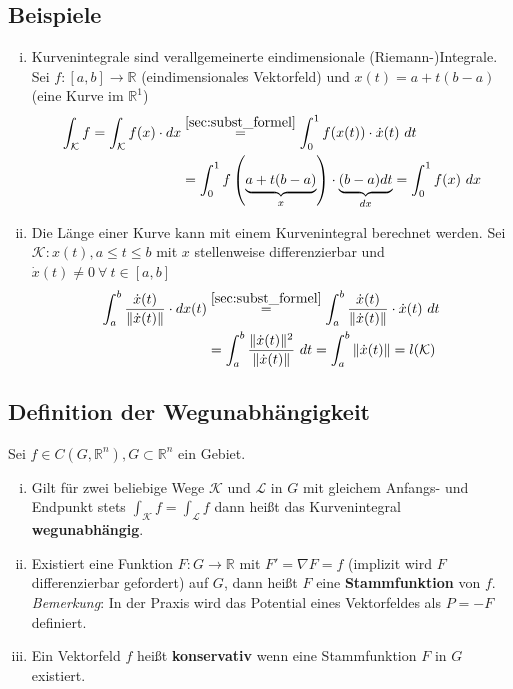 \documentclass[11pt,a4paper]{book}
\newcommand {\R}	{\mathbb{R}}
\newcommand {\Rn}	{\mathbb{R}^n}
\newcommand{\1}    	{\mathbbm{1}}
\newcommand{\Kurve}	{{\mathcal{K}}}
\newcommand{\Bemerkung}	{\noindent\textit{Bemerkung}: }
\begin{document}
\subsection{Beispiele}
\begin{enumerate}[(i)]
	\item Kurvenintegrale sind verallgemeinerte eindimensionale (Riemann-)Integrale. Sei \(f : [a,b] \rightarrow \R \) (eindimensionales Vektorfeld) und \(x(t) = a + t(b - a)\) (eine Kurve im \(\R^1\))
	\begin{align*}
		\int_\Kurve f = \int_\Kurve f(x) \cdot dx 
		&\stackrel{\ref{sec:subst_formel}}{=} 
		\int_0^1 f(x(t)) \cdot \dot{x}(t) ~dt \\
		&= 
		\int_0^1 f\left(\underbrace{a + t(b-a)}_{x}\right)\cdot \underbrace{(b-a) dt}_{dx} = \int_0^1 f(x) ~dx
	\end{align*}
	\item Die Länge einer Kurve kann mit einem Kurvenintegral berechnet werden. Sei \(\Kurve : x(t), a \leqslant t \leqslant b\) mit \(x\) stellenweise differenzierbar und \(\dot{x}(t) \neq 0 ~\forall~ t \in [a,b]\)
	\begin{align*}
		\int_a^b \frac{\dot{x}(t)}{\Vert \dot{x}(t) \Vert} \cdot dx(t) 
		&\stackrel{\ref{sec:subst_formel}}{=} 
		\int_a^b \frac{\dot{x}(t)}{\Vert \dot{x}(t) \Vert} \cdot \dot{x}(t) ~dt \\
		&= \int_a^b \frac{\Vert \dot{x}(t) \Vert^2}{\Vert \dot{x}(t) \Vert} ~dt = \int_a^b \Vert \dot{x}(t) \Vert = l(\Kurve)
	\end{align*}
\end{enumerate}


\subsection{Definition der Wegunabhängigkeit}
Sei \(f \in C(G,\Rn), G \subset \Rn\) ein Gebiet.
\begin{enumerate}[(i)]
	\item Gilt für zwei beliebige Wege \(\Kurve\) und \(\mathcal{L}\) in \(G\) mit gleichem Anfangs- und Endpunkt stets \(\int_\Kurve f = \int_\mathcal{L} f\) dann heißt das Kurvenintegral \textbf{wegunabhängig}.
	\item Existiert eine Funktion \(F:G \rightarrow \R\) mit \(F' = \nabla F = f\) (implizit wird \(F\) differenzierbar gefordert) auf \(G\), dann heißt \(F\) eine \textbf{Stammfunktion} von \(f\).\\
	\Bemerkung In der Praxis wird das Potential eines Vektorfeldes als \(P = -F\) definiert.
	\item Ein Vektorfeld \(f\) heißt \textbf{konservativ} wenn eine Stammfunktion \(F\) in \(G\) existiert.
\end{enumerate}
\end{document}
